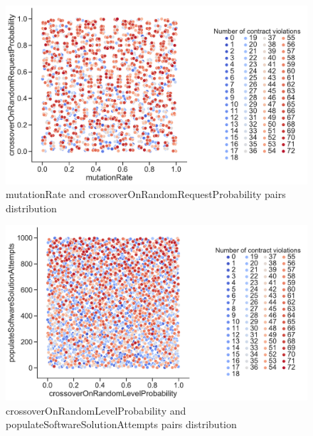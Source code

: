 \begin{figure}
	\centering
	\includegraphics[width=\textwidth]{images/PairsDistr/mutationRate_crossoverOnRandomRequestProbability.pdf}
	\caption[]{mutationRate and crossoverOnRandomRequestProbability pairs distribution}
	\label{fig:mutationRate_crossoverOnRandomRequestProbability_pair}
\end{figure}


\begin{figure}
	\centering
	\includegraphics[width=\textwidth]{images/PairsDistr/crossoverOnRandomLevelProbability_populateSoftwareSolutionAttempts.pdf}
	\caption[]{crossoverOnRandomLevelProbability and populateSoftwareSolutionAttempts pairs distribution}
	\label{fig:crossoverOnRandomLevelProbability_populateSoftwareSolutionAttempts_pair}
\end{figure}